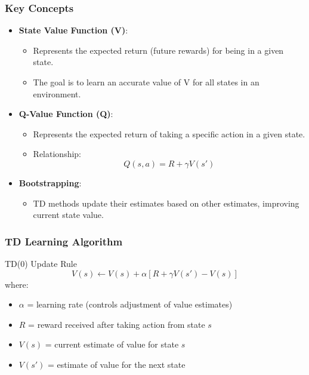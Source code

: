 \documentclass[aspectratio=169]{beamer}
\begin{document}
\begin{frame}[fragile]
  \frametitle{Key Concepts}
  \begin{itemize}
    \item \textbf{State Value Function (V)}:
      \begin{itemize}
        \item Represents the expected return (future rewards) for being in a given state.
        \item The goal is to learn an accurate value of V for all states in an environment.
      \end{itemize}
    
    \item \textbf{Q-Value Function (Q)}:
      \begin{itemize}
        \item Represents the expected return of taking a specific action in a given state.
        \item Relationship:
        \[
        Q(s, a) = R + \gamma V(s')
        \]
      \end{itemize}
    
    \item \textbf{Bootstrapping}:
      \begin{itemize}
        \item TD methods update their estimates based on other estimates, improving current state value.
      \end{itemize}
  \end{itemize}
\end{frame}

\begin{frame}[fragile]
  \frametitle{TD Learning Algorithm}
  \begin{block}{TD(0) Update Rule}
    \[
    V(s) \leftarrow V(s) + \alpha \left[ R + \gamma V(s') - V(s) \right]
    \]
    where:
    \begin{itemize}
      \item \( \alpha \) = learning rate (controls adjustment of value estimates)
      \item \( R \) = reward received after taking action from state \( s \)
      \item \( V(s) \) = current estimate of value for state \( s \)
      \item \( V(s') \) = estimate of value for the next state
    \end{itemize}
  \end{block}
\end{frame}
\end{document}
